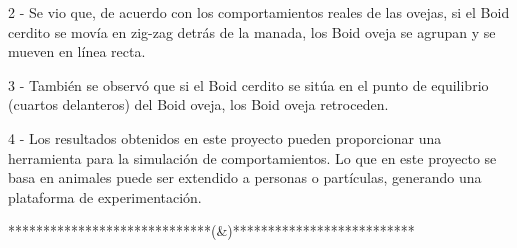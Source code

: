 
2 - Se vio que, de acuerdo con los comportamientos reales de las ovejas, si el Boid cerdito se movía en zig-zag detrás de la manada, los Boid 
oveja se agrupan y se mueven en línea recta.

3 - También se observó que si el Boid cerdito se sitúa en el punto de equilibrio (cuartos delanteros) del Boid oveja, los Boid oveja retroceden.

4 - Los resultados obtenidos en este proyecto pueden proporcionar una herramienta para la simulación de comportamientos. Lo que en este
proyecto se basa en animales puede ser extendido a personas o partículas, generando una plataforma de experimentación.


*****************************(&)**************************